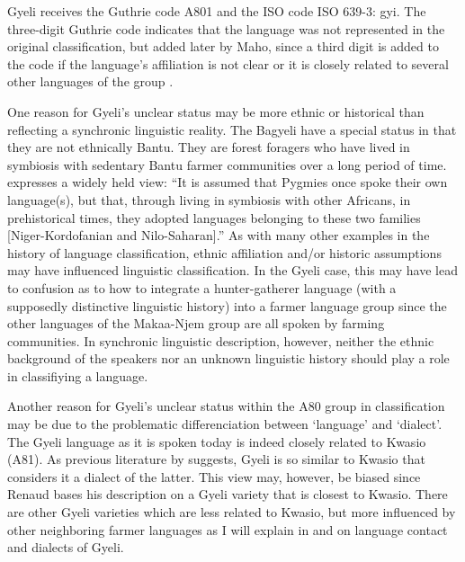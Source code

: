 Gyeli receives the Guthrie code A801 and the ISO code ISO 639-3: gyi.   The  three-digit Guthrie code indicates that the language was not represented in the original classification, but added later by Maho, since a third digit is added to the code if the language's affiliation is not clear or it is closely related to several other languages of the group  \citep[46]{maho2001}.

One reason for Gyeli's unclear status may be more ethnic or historical than reflecting a synchronic linguistic reality. The Bagyeli have a special status in that they are not ethnically Bantu. They are forest foragers who have lived in symbiosis with sedentary Bantu farmer communities over a long period of time. \citet[154]{ruhlen94} expresses a widely held view: ``It is assumed that Pygmies once spoke their own language(s), but that, through living in symbiosis with other Africans, in prehistorical times, they adopted languages belonging to these two families [Niger-Kordofanian and Nilo-Saharan].''
As with many other examples in the history of language classification, ethnic affiliation and/or historic assumptions may have influenced linguistic classification. In the Gyeli case, this may have lead to confusion as to how to integrate a hunter-gatherer language (with a supposedly distinctive linguistic history) into a farmer language group since the other languages of the Makaa-Njem group are all spoken by farming communities. In synchronic linguistic description, however, neither the ethnic background of the speakers nor an unknown linguistic history should play a role in classifiying a language.

Another reason for Gyeli's unclear status within the A80 group in  classification may be due to the problematic differenciation between `language' and `dialect'. The Gyeli language as it is spoken today is indeed closely related to Kwasio (A81). As previous literature by \citet{renaud76} suggests, Gyeli is so similar to Kwasio that \citet{bahuchet2006} considers it a dialect of the latter. This view may, however, be biased since Renaud bases his description on a Gyeli variety that is closest to Kwasio. There are other Gyeli varieties which are less related to Kwasio, but more influenced by other neighboring farmer languages as I will explain in  and  on language contact and dialects of Gyeli. 

